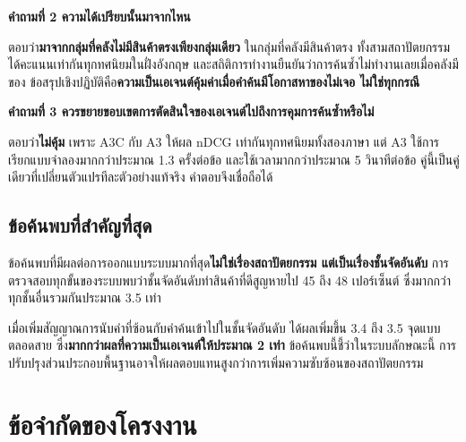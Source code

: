 \textbf{คำถามที่ 2 ความได้เปรียบนั้นมาจากไหน}

ตอบว่า\textbf{มาจากกลุ่มที่คลังไม่มีสินค้าตรงเพียงกลุ่มเดียว} ในกลุ่มที่คลังมีสินค้าตรง ทั้งสามสถาปัตยกรรมได้คะแนนเท่ากันทุกทศนิยมในฝั่งอังกฤษ และสถิติการทำงานยืนยันว่าการค้นซ้ำไม่ทำงานเลยเมื่อคลังมีของ ข้อสรุปเชิงปฏิบัติคือ\textbf{ความเป็นเอเจนต์คุ้มค่าเมื่อคำค้นมีโอกาสหาของไม่เจอ ไม่ใช่ทุกกรณี}

\textbf{คำถามที่ 3 ควรขยายขอบเขตการตัดสินใจของเอเจนต์ไปถึงการคุมการค้นซ้ำหรือไม่}

ตอบว่า\textbf{ไม่คุ้ม} เพราะ A3C กับ A3 ให้ผล nDCG เท่ากันทุกทศนิยมทั้งสองภาษา แต่ A3 ใช้การเรียกแบบจำลองมากกว่าประมาณ 1.3 ครั้งต่อข้อ และใช้เวลามากกว่าประมาณ 5 วินาทีต่อข้อ คู่นี้เป็นคู่เดียวที่เปลี่ยนตัวแปรทีละตัวอย่างแท้จริง คำตอบจึงเชื่อถือได้

\subsection{ข้อค้นพบที่สำคัญที่สุด}

ข้อค้นพบที่มีผลต่อการออกแบบระบบมากที่สุด\textbf{ไม่ใช่เรื่องสถาปัตยกรรม แต่เป็นเรื่องชั้นจัดอันดับ} การตรวจสอบทุกขั้นของระบบพบว่าชั้นจัดอันดับทำสินค้าที่ดีสูญหายไป 45 ถึง 48 เปอร์เซ็นต์ ซึ่งมากกว่าทุกชั้นอื่นรวมกันประมาณ 3.5 เท่า

เมื่อเพิ่มสัญญาณการนับคำที่ซ้อนกับคำค้นเข้าไปในชั้นจัดอันดับ ได้ผลเพิ่มขึ้น 3.4 ถึง 3.5 จุดแบบตลอดสาย ซึ่ง\textbf{มากกว่าผลที่ความเป็นเอเจนต์ให้ประมาณ 2 เท่า} ข้อค้นพบนี้ชี้ว่าในระบบลักษณะนี้ การปรับปรุงส่วนประกอบพื้นฐานอาจให้ผลตอบแทนสูงกว่าการเพิ่มความซับซ้อนของสถาปัตยกรรม

\section{ข้อจำกัดของโครงงาน}

